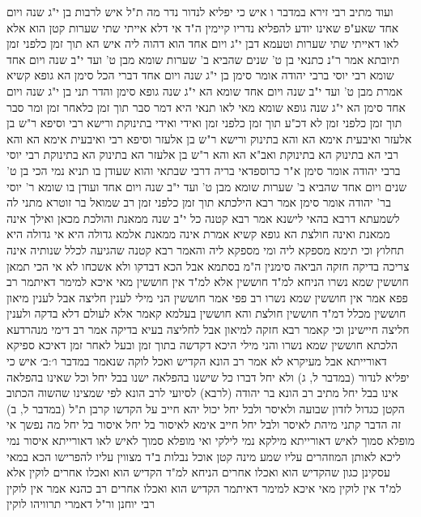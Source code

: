 \documentclass[12pt, openany]{book}
\begin{document}
{ועוד מתיב רבי זירא  {במדבר ו } איש כי יפליא לנדור נדר מה ת"ל איש לרבות בן י"ג שנה ויום אחד שאע"פ שאינו יודע להפליא נדריו קיימין 
ה"ד  אי דלא אייתי שתי שערות קטן הוא  אלא לאו דאייתי שתי שערות וטעמא דבן י"ג ויום אחד הוא דהוה ליה איש הא תוך זמן כלפני זמן  תיובתא 
אמר ר"נ  כתנאי בן ט' שנים שהביא ב' שערות שומא מבן ט' ועד י"ב שנה ויום אחד שומא  רבי יוסי ברבי יהודה אומר  סימן  בן י"ג שנה ויום אחד דברי הכל סימן 
הא גופא קשיא אמרת מבן ט' ועד י"ב שנה ויום אחד שומא הא י"ג שנה גופא סימן  והדר תני בן י"ג שנה ויום אחד סימן הא י"ג שנה גופא שומא 
מאי לאו תנאי היא דמר סבר  תוך זמן כלאחר זמן ומר סבר  תוך זמן כלפני זמן 
לא דכ"ע תוך זמן כלפני זמן ואידי ואידי בתינוקת  ורישא רבי וסיפא ר"ש בן אלעזר 
ואיבעית אימא  הא והא בתינוק ורישא ר"ש בן אלעזר וסיפא רבי 
ואיבעית אימא  הא והא רבי הא בתינוק הא בתינוקת  ואב"א  הא והא ר"ש בן אלעזר הא בתינוק הא בתינוקת 
רבי יוסי ברבי יהודה אומר  סימן  א"ר כרוספדאי בריה דרבי שבתאי  והוא שעודן בו 
תניא נמי הכי בן ט' שנים ויום אחד שהביא ב' שערות שומא מבן ט' ועד י"ב שנה ויום אחד ועודן בו שומא  ר' יוסי בר' יהודה אומר  סימן 
אמר רבא  הילכתא תוך זמן כלפני זמן  רב שמואל בר זוטרא מתני לה לשמעתא דרבא בהאי לישנא אמר רבא  קטנה כל י"ב שנה ממאנת והולכת מכאן ואילך אינה ממאנת ואינה חולצת 
הא גופא קשיא אמרת אינה ממאנת אלמא גדולה היא אי גדולה היא תחלוץ 
וכי תימא מספקא ליה ומי מספקא ליה  והאמר רבא  קטנה שהגיעה לכלל שנותיה אינה צריכה בדיקה חזקה הביאה סימנין 
ה"מ בסתמא אבל הכא דבדקו ולא אשכחו לא 
אי הכי תמאן  חוששין שמא נשרו 
הניחא למ"ד חוששין אלא למ"ד אין חוששין מאי איכא למימר  דאיתמר רב פפא אמר  אין חוששין שמא נשרו רב פפי אמר  חוששין  הני מילי לענין חליצה אבל לענין מיאון חוששין 
מכלל דמ"ד חוששין חולצת  והא חוששין בעלמא קאמר 
אלא לעולם דלא בדקה ולענין חליצה חיישינן וכי קאמר רבא חזקה למיאון אבל לחליצה בעיא בדיקה 
אמר רב דימי מנהרדעא  הלכתא חוששין שמא נשרו 
והני מילי היכא דקדשה בתוך זמן ובעל לאחר זמן דאיכא ספיקא דאורייתא אבל מעיקרא לא 
אמר רב הונא  הקדיש ואכל לוקה
שנאמר {במדבר ו׳:ב׳ } איש כי יפליא לנדור (במדבר ל, ג) ולא יחל דברו כל שישנו בהפלאה ישנו בבל יחל וכל שאינו בהפלאה אינו בבל יחל 
מתיב רב הונא בר יהודה (לרבא) לסיועי לרב הונא
לפי שמצינו שהשוה הכתוב הקטן כגדול לזדון שבועה ולאיסר ולבל יחל יכול יהא חייב על הקדשו קרבן 
ת"ל (במדבר ל, ב) זה הדבר 
קתני מיהת לאיסר ולבל יחל חייב  אימא  לאיסור בל יחל 
איסור בל יחל מה נפשך אי מופלא סמוך לאיש דאורייתא מילקא נמי לילקי ואי מופלא סמוך לאיש לאו דאורייתא איסור נמי ליכא  לאותן המוזהרים עליו 
שמע מינה  קטן אוכל נבלות ב"ד מצווין עליו להפרישו  הכא במאי עסקינן כגון שהקדיש הוא ואכלו אחרים 
הניחא למ"ד הקדיש הוא ואכלו אחרים לוקין אלא למ"ד אין לוקין מאי איכא למימר  דאיתמר הקדיש הוא ואכלו אחרים רב כהנא אמר  אין לוקין רבי יוחנן ור"ל דאמרי תרוויהו  לוקין 
}
\end{document}
